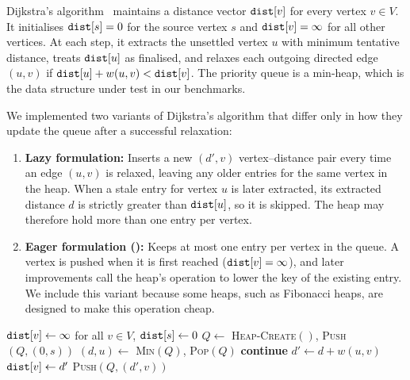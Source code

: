 \vspace{0.2cm}
\noindent
Dijkstra's algorithm~\cite{dijkstra1959} maintains a distance vector $\code{dist}[v]$ for every vertex $v \in V$. It initialises $\code{dist}[s] = 0$ for the source vertex $s$ and $\code{dist}[v] = \infty$ for all other vertices. At each step, it extracts the unsettled vertex $u$ with minimum tentative distance, treats $\code{dist}[u]$ as finalised, and relaxes each outgoing directed edge $(u,v)$ if $\code{dist}[u] + w(u,v) < \code{dist}[v]$. The priority queue is a min-heap, which is the data structure under test in our benchmarks.

We implemented two variants of Dijkstra's algorithm that differ only in how they update the queue after a successful relaxation:
\begin{enumerate}
  \item \textbf{Lazy formulation:} Inserts a new $(d', v)$ vertex--distance pair every time an edge $(u, v)$ is relaxed, leaving any older entries for the same vertex in the heap. When a stale entry for vertex $u$ is later extracted, its extracted distance $d$ is strictly greater than $\code{dist}[u]$, so it is skipped. The heap may therefore hold more than one entry per vertex.
  \item \textbf{Eager formulation ():} Keeps at most one entry per vertex in the queue. A vertex is pushed when it is first reached ($\code{dist}[v] = \infty$), and later improvements call the heap's  operation to lower the key of the existing entry. We include this variant because some heaps, such as Fibonacci heaps, are designed to make this operation cheap.
\end{enumerate}

\begin{algorithm}[H]
\caption{Dijkstra's algorithm, lazy formulation}
\begin{algorithmic}[1]
\STATE $\code{dist}[v] \leftarrow \infty$ for all $v \in V$, \quad $\code{dist}[s] \leftarrow 0$
\STATE $Q \leftarrow$ \textsc{Heap-Create}$()$, \quad \textsc{Push}$(Q, (0, s))$
  \STATE $(d, u) \leftarrow$ \textsc{Min}$(Q)$, \quad \textsc{Pop}$(Q)$
    \STATE \textbf{continue} 
  \ENDIF
    \STATE $d' \leftarrow d + w(u,v)$
      \STATE $\code{dist}[v] \leftarrow d'$
      \STATE \textsc{Push}$(Q, (d', v))$
    \ENDIF
  \ENDFOR
\ENDWHILE
\end{algorithmic}
\end{algorithm}

